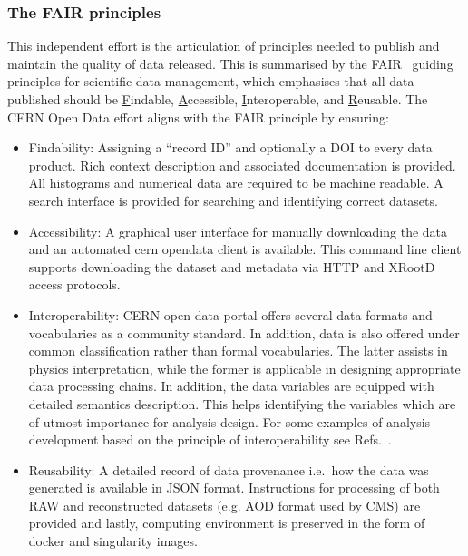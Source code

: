 \documentclass[10pt]{article}
\begin{document}
\subsubsection{The FAIR principles}
%
This independent effort is the articulation of principles needed to publish and maintain the quality of data released.  This is summarised by the FAIR~\cite{FAIR} guiding principles for scientific data management, which emphasises that all data published should be \ul{F}indable, \ul{A}ccessible, \ul{I}nteroperable, and \ul{R}eusable.  The CERN Open Data effort aligns with the FAIR principle by ensuring: \begin{itemize}
	\item Findability: Assigning a “record ID” and optionally a DOI to every data product.  Rich context description and associated documentation is provided.  All histograms and numerical data are required to be machine readable.  A search interface is provided for searching and identifying correct datasets.
	
	\item Accessibility: A graphical user interface for manually downloading the data and an automated cern opendata client is available.  This command line client supports downloading the dataset and metadata via HTTP and XRootD access protocols.
	
	\item Interoperability: CERN open data portal offers several data formats and vocabularies as a community standard. In addition, data is also offered under common classification rather than formal vocabularies. The latter assists in physics interpretation, while the former is applicable in designing appropriate data processing chains. In addition, the data variables are equipped with detailed semantics description. This helps identifying the variables which are of utmost importance for analysis design. For some examples of analysis development based on the principle of interoperability see Refs.~\cite{Wunsch:dimuon, Wunsch:higgs}.
	
	\item Reusability: A detailed record of data provenance i.e.\ how the data was generated is available in JSON format.  Instructions for processing of both RAW and reconstructed datasets (e.g. AOD format used by CMS) are provided and lastly, computing environment is preserved in the form of docker and singularity images. 
\end{itemize}
\end{document}
